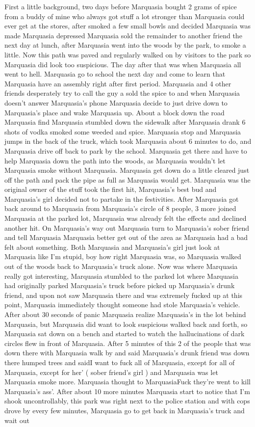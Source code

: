 \documentclass[12pt]{book}
\begin{document}
First a little background, two days before Marquasia bought 2 grams of spice from a buddy of mine who always got stuff a lot stronger than Marquasia could ever get at the stores, after smoked a few small bowls and decided Marquasia was made Marquasia depressed Marquasia sold the remainder to another friend the next day at lunch, after Marquasia went into the woods by the park, to smoke a little. Now this path was paved and regularly walked on by visitors to the park so Marquasia did look too suspicious. The day after that was when Marquasia all went to hell. Marquasia go to school the next day and come to learn that Marquasia have an assembly right after first period. Marquasia and 4 other friends desperately try to call the guy a sold the spice to and when Marquasia doesn't answer Marquasia's phone Marquasia decide to just drive down to Marquasia's place and wake Marquasia up. About a block down the road Marquasia find Marquasia stumbled down the sidewalk after Marquasia drank 6 shots of vodka smoked some weeded and spice. Marquasia stop and Marquasia jumps in the back of the truck, which took Marquasia about 6 minutes to do, and Marquasia drive off back to park by the school. Marquasia get there and have to help Marquasia down the path into the woods, as Marquasia wouldn't let Marquasia smoke without Marquasia. Marquasia get down do a little cleared just off the path and pack the pipe as full as Marquasia would get. Marquasia was the original owner of the stuff took the first hit, Marquasia's best bud and Marquasia's girl decided not to partake in the festivities. After Marquasia got back around to Marquasia from Marquasia's circle of 8 people, 3 more joined Marquasia at the parked lot, Marquasia was already felt the effects and declined another hit. On Marquasia's way out Marquasia turn to Marquasia's sober friend and tell Marquasia Marquasia better get out of the area as Marquasia had a bad felt about something. Both Marquasia and Marquasia's girl just look at Marquasia like I'm stupid, boy how right Marquasia was, so Marquasia walked out of the woods back to Marquasia's truck alone. Now was where Marquasia really got interesting, Marquasia stumbled to the parked lot where Marquasia had originally parked Marquasia's truck before picked up Marquasia's drunk friend, and upon not saw Marquasia there and was extremely fucked up at this point, Marquasia immediately thought someone had stole Marquasia's vehicle. After about 30 seconds of panic Marquasia realize Marquasia's in the lot behind Marquasia, but Marquasia did want to look suspicious walked back and forth, so Marquasia sat down on a bench and started to watch the hallucinations of dark circles flew in front of Marquasia. After 5 minutes of this 2 of the people that was down there with Marquasia walk by and said Marquasia's drunk friend was down there humped trees and saidI want to fuck all of Marquasia, except for all of Marquasia, except for her' ( sober friend's girl ) and Marquasia was let Marquasia smoke more. Marquasia thought to MarquasiaFuck they're went to kill Marquasia's ass'. After about 10 more minutes Marquasia start to notice that I'm shook uncontrollably, this park was right next to the police station and with cops drove by every few minutes, Marquasia go to get back in Marquasia's truck and wait out 
\end{document}
